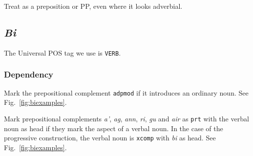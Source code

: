 \documentclass[a4paper]{article}
\begin{document}
 Treat as a preposition or PP, even where it looks adverbial.

\subsection{\textit{Bi}\label{subsect:bi}}

The Universal POS tag we use is \texttt{VERB}.

\subsubsection*{Dependency}

 Mark the prepositional complement \texttt{adpmod} if it introduces an ordinary noun. See Fig.~\ref{fig:biexamples}.

 Mark prepositional complements \textit{a'}, \textit{ag}, \textit{ann}, \textit{ri}, \textit{gu} and \textit{air} as \texttt{prt} with the verbal noun as head if they mark the aspect of a verbal noun.
In the case of the progressive construction, the verbal noun is \texttt{xcomp} with \textit{bi} as head.
See Fig.~\ref{fig:biexamples}.
\end{document}

